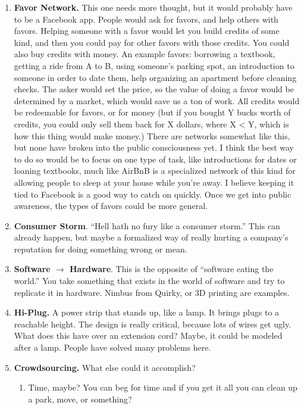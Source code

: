 \documentclass[paper=a4, fontsize=11pt]{scrartcl} %
\numberwithin{equation}{section} %
\numberwithin{figure}{section} %
\numberwithin{table}{section} %
\begin{document}
\begin{enumerate}
\item \textbf{Favor Network.}  This one needs more thought, but it would probably have to be a Facebook app.  People would ask for favors, and help others with favors.  Helping someone with a favor would let you build credits of some kind, and then you could pay for other favors with those credits.  You could also buy credits with money.  An example favors: borrowing a textbook, getting a ride from A to B, using someone's parking spot, an introduction to someone in order to date them, help organizing an apartment before cleaning checks.  The asker would set the price, so the value of doing a favor would be determined by a market, which would save us a ton of work.  All credits would be redeemable for favors, or for money (but if you bought Y bucks worth of credits, you could only sell them back for X dollars, where X < Y, which is how this thing would make money.)  There are networks somewhat like this, but none have broken into the public consciousness yet.  I think the best way to do so would be to focus on one type of task, like introductions for dates or loaning textbooks, much like AirBnB is a specialized network of this kind for allowing people to sleep at your house while you're away.  I believe keeping it tied to Facebook is a good way to catch on quickly.  Once we get into public awareness, the types of favors could be more general.  


\item \textbf{Consumer Storm}.  ``Hell hath no fury like a consumer storm.''  This can already happen, but maybe a formalized way of really hurting a company's reputation for doing something wrong or mean.  

\item \textbf{Software $\rightarrow$ Hardware}.  This is the opposite of ``software eating the world.''  You take something that exists in the world of software and try to replicate it in hardware.  Nimbus from Quirky, or 3D printing are examples.  
\item \textbf{Hi-Plug.}  A power strip that stands up, like a lamp.  It brings plugs to a reachable height.  The design is really critical, because lots of wires get ugly.  What does this have over an extension cord?  Maybe, it could be modeled after a lamp.  People have solved many problems here. 

\item \textbf{Crowdsourcing.}  What else could it accomplish?
	\begin{enumerate}
	\item Time, maybe?  You can beg for time and if you get it all you can clean up a park, move, or something?
	\end{enumerate}


\end{enumerate}
\end{document}
